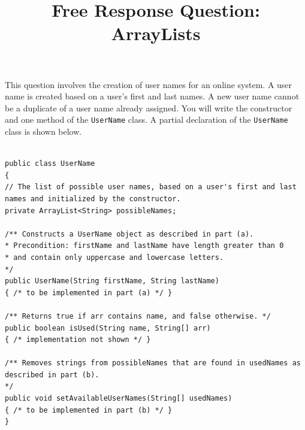 \documentclass{exam}
\title{Free Response Question: ArrayLists}
\author{  }
\begin{document}
\maketitle
\noindent This question involves the creation of user names for an online system. A user name is created based on a user's first and last names. A new user name cannot be a duplicate of a user name already assigned. You will write the constructor and one method of the \texttt{UserName} class. A partial declaration of the \texttt{UserName}  class is shown below.





\begin{lstlisting}

public class UserName
{
// The list of possible user names, based on a user's first and last names and initialized by the constructor.
private ArrayList<String> possibleNames;
 
/** Constructs a UserName object as described in part (a).
* Precondition: firstName and lastName have length greater than 0
* and contain only uppercase and lowercase letters.
*/
public UserName(String firstName, String lastName)
{ /* to be implemented in part (a) */ }
 
/** Returns true if arr contains name, and false otherwise. */
public boolean isUsed(String name, String[] arr)
{ /* implementation not shown */ }
 
/** Removes strings from possibleNames that are found in usedNames as described in part (b).
*/
public void setAvailableUserNames(String[] usedNames)
{ /* to be implemented in part (b) */ }
}
\end{lstlisting}
\newpage
\end{document}
